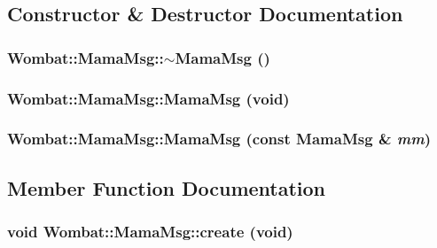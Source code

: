 \subsection{Constructor \& Destructor Documentation}
\hypertarget{classWombat_1_1MamaMsg_a455ca709ce0c3c45b869afb4e01e97e7}{
\subsubsection[{$\sim$MamaMsg}]{\setlength{\rightskip}{0pt plus 5cm}Wombat::MamaMsg::$\sim$MamaMsg ()}}
\label{classWombat_1_1MamaMsg_a455ca709ce0c3c45b869afb4e01e97e7}
\hypertarget{classWombat_1_1MamaMsg_a830740c87dbf0d0e47439686d5cef778}{
\subsubsection[{MamaMsg}]{\setlength{\rightskip}{0pt plus 5cm}Wombat::MamaMsg::MamaMsg (void)}}
\label{classWombat_1_1MamaMsg_a830740c87dbf0d0e47439686d5cef778}
\hypertarget{classWombat_1_1MamaMsg_a00d40118467e82990c47276cac401ee8}{
\subsubsection[{MamaMsg}]{\setlength{\rightskip}{0pt plus 5cm}Wombat::MamaMsg::MamaMsg (const {\bf MamaMsg} \& {\em mm})}}
\label{classWombat_1_1MamaMsg_a00d40118467e82990c47276cac401ee8}


\subsection{Member Function Documentation}
\hypertarget{classWombat_1_1MamaMsg_ab064f6030112a708c63da5562ca35447}{
\subsubsection[{create}]{\setlength{\rightskip}{0pt plus 5cm}void Wombat::MamaMsg::create (void)}}
\label{classWombat_1_1MamaMsg_ab064f6030112a708c63da5562ca35447}


